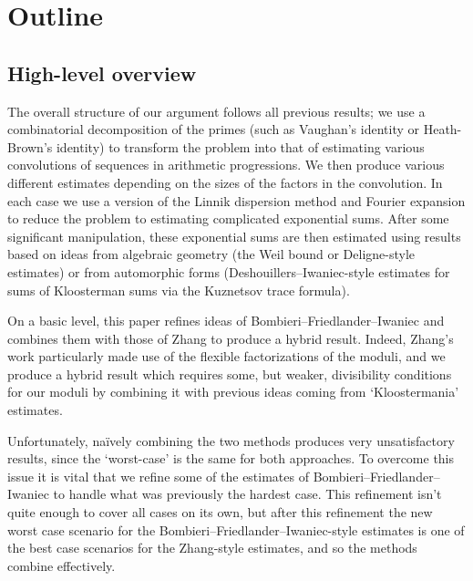\documentclass[10pt]{amsart}
\theoremstyle{plain}
\numberwithin{equation}{section}
\begin{document}
\section{Outline}\label{sec:Outline}
%
%
%
%
\subsection{High-level overview}
%
%
%
%
The overall structure of our argument follows all previous results; we use a combinatorial decomposition of the primes (such as Vaughan's identity or Heath-Brown's identity) to transform the problem into that of estimating various convolutions of sequences in arithmetic progressions. We then produce various different estimates depending on the sizes of the factors in the convolution. In each case we use a version of the Linnik dispersion method and Fourier expansion to reduce the problem to estimating complicated exponential sums. After some significant manipulation, these exponential sums are then estimated using results based on ideas from algebraic geometry (the Weil bound or Deligne-style estimates) or from automorphic forms (Deshouillers--Iwaniec-style estimates for sums of Kloosterman sums via the Kuznetsov trace formula).

On a basic level, this paper refines ideas of Bombieri--Friedlander--Iwaniec and combines them with those of Zhang to produce a hybrid result. Indeed, Zhang's work particularly made use of the flexible factorizations of the moduli, and we produce a hybrid result which requires some, but weaker, divisibility conditions for our moduli by combining it with previous ideas coming from `Kloostermania' estimates. 

Unfortunately, na\"ively combining the two methods produces very unsatisfactory results, since the `worst-case' is the same for both approaches. To overcome this issue it is vital that we refine some of the estimates of Bombieri--Friedlander--Iwaniec to handle what was previously the hardest case. This refinement isn't quite enough to cover all cases on its own, but after this refinement the new worst case scenario for the Bombieri--Friedlander--Iwaniec-style estimates is one of the best case scenarios for the Zhang-style estimates, and so the methods combine effectively.
%
%
%
%
\end{document}
